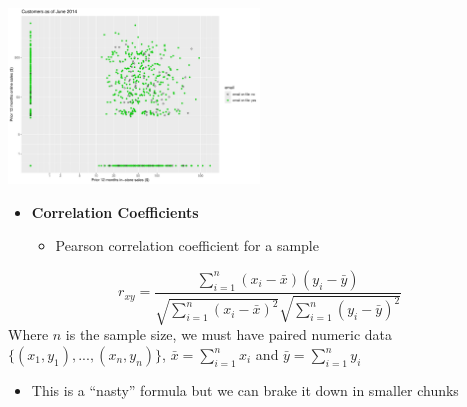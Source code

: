 \documentclass[
  ignorenonframetext,
]{beamer}
\providecommand{\tightlist}{%
  \setlength{\itemsep}{0pt}\setlength{\parskip}{0pt}}\usepackage{longtable,booktabs,array}
\begin{document}
\begin{frame}[fragile]{}
\begin{center}
\includegraphics[width=0.5\textwidth,height=\textheight]{004_relationships_between_continuous_variables_files/figure-beamer/unnamed-chunk-14-1.pdf}
\end{center}
\end{frame}

\begin{frame}{}
\label{section-17}
\begin{itemize}
\item
  \textbf{Correlation Coefficients}

  \begin{itemize}
  \tightlist
  \item
    Pearson correlation coefficient for a sample
  \end{itemize}
\end{itemize}

\small

\[r_{xy} = \frac{\sum_{i=1}^n (x_i - \bar{x})(y_i - \bar{y})}{\sqrt{\sum_{i=1}^n (x_i - \bar{x})^2}\sqrt{\sum_{i=1}^n (y_i - \bar{y})^2}}\]
Where \(n\) is the sample size, we must have paired numeric data
\(\{ (x_1, y_1), ..., (x_n, y_n) \}\), \(\bar{x} = \sum_{i=1}^n x_i\)
and \(\bar{y} = \sum_{i=1}^n y_i\)

\begin{itemize}
\tightlist
\item
  This is a ``nasty'' formula but we can brake it down in smaller chunks
\end{itemize}
\end{frame}
\end{document}
